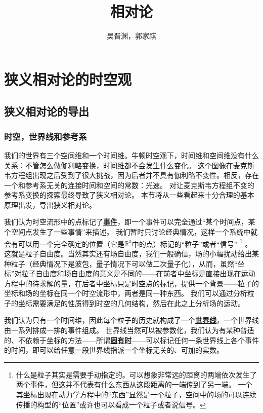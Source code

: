 \documentclass[hyperref, UTF8, a4paper]{ctexart}
\title{相对论}
\author{吴晋渊，郭家祺}
\newcommand*{\concept}[1]{\underline{\textbf{#1}}}
\begin{document}
\maketitle

\section{狭义相对论的时空观}

\subsection{狭义相对论的导出}

\subsubsection{时空，世界线和参考系}

我们的世界有三个空间维和一个时间维。牛顿时空观下，时间维和空间维没有什么关系：不管怎么做伽利略变换，时间维都不会发生什么变化。
这个图像在麦克斯韦方程组出现之后受到了很大挑战，因为后者并不具有伽利略不变性。相反，存在一个和参考系无关的连接时间和空间的常数：光速。
对让麦克斯韦方程组不变的参考系变换的探索最终导致了狭义相对论。
本节将从一些看起来十分合理的基本原理出发，导出狭义相对论。

我们认为时空流形中的点标记了\concept{事件}，即一个事件可以完全通过“某个时间点，某个空间点发生了一些事情”来描述。
我们暂时只讨论经典情况，这样一个系统中就会有可以用一个完全确定的位置（它是$\mathbb{R}^3$中的点）标记的“粒子”或者“信号”%
\footnote{什么是粒子其实是需要手动指定的。可以想象非常远的距离的两端依次发生了两个事件，但这并不代表有什么东西从这段距离的一端传到了另一端。
一个其坐标出现在动力学方程中的“东西”显然是一个粒子，空间中的场的可以连续传播的构型的“位置”或许也可以看成一个粒子或者说信号。
}%
。
这就是粒子自由度。当然其实还有场自由度，我们一般确信，场的小幅扰动给出某种粒子（经典情况下是波包，量子情况下可以做二次量子化），从而，虽然“坐标”对粒子自由度和场自由度的意义是不同的——在前者中坐标是直接出现在运动方程中的待求解的量，在后者中坐标只是时空点的标记，提供一个背景——粒子的坐标和场的坐标在同一个时空流形中，两者是同一种东西。
我们可以通过分析粒子的坐标需要满足的性质得到时空的几何结构，然后在此之上分析场的运动。

我们认为只有一个时间维，因此每个粒子的历史就构成了一个\concept{世界线}，一个世界线由一系列排成一排的事件组成。
世界线当然可以被参数化，我们认为有某种普适的、不依赖于坐标的方法——所谓\concept{固有时}——可以标记任何一条世界线上各个事件的时间，即可以给任意一段世界线指派一个坐标无关的、可加的实数。
\end{document}
